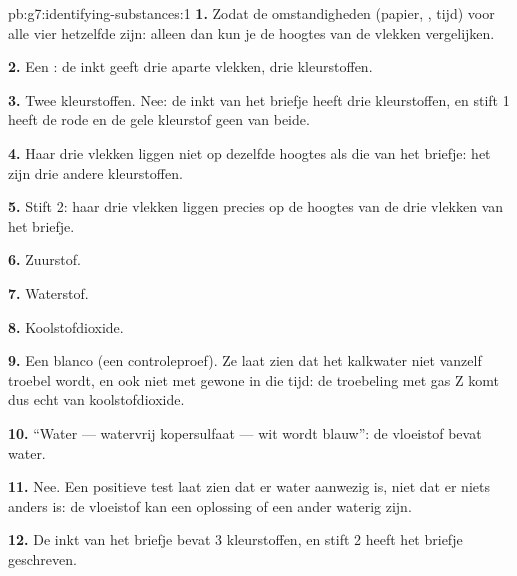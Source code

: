 \begin{solution}{pb:g7:identifying-substances:1}
\textbf{1.} Zodat de omstandigheden (papier, , tijd) voor alle
vier hetzelfde zijn: alleen dan kun je de hoogtes van de vlekken
vergelijken.

\textbf{2.} Een : de inkt geeft drie aparte vlekken, drie
kleurstoffen.

\textbf{3.} Twee kleurstoffen. Nee: de inkt van het briefje heeft drie
kleurstoffen, en stift 1 heeft de rode en de gele kleurstof geen van
beide.

\textbf{4.} Haar drie vlekken liggen niet op dezelfde hoogtes als die
van het briefje: het zijn drie andere kleurstoffen.

\textbf{5.} Stift 2: haar drie vlekken liggen precies op de hoogtes van
de drie vlekken van het briefje.

\textbf{6.} Zuurstof.

\textbf{7.} Waterstof.

\textbf{8.} Koolstofdioxide.

\textbf{9.} Een blanco (een controleproef). Ze laat zien dat het
kalkwater niet vanzelf troebel wordt, en ook niet met gewone  in
die tijd: de troebeling met gas Z komt dus echt van koolstofdioxide.

\textbf{10.} ``Water --- watervrij kopersulfaat --- wit wordt blauw'':
de vloeistof bevat water.

\textbf{11.} Nee. Een positieve test laat zien dat er water aanwezig is,
niet dat er niets anders is: de vloeistof kan een oplossing of een ander
waterig  zijn.

\textbf{12.} De inkt van het briefje bevat 3 kleurstoffen, en stift 2
heeft het briefje geschreven.
\end{solution}
